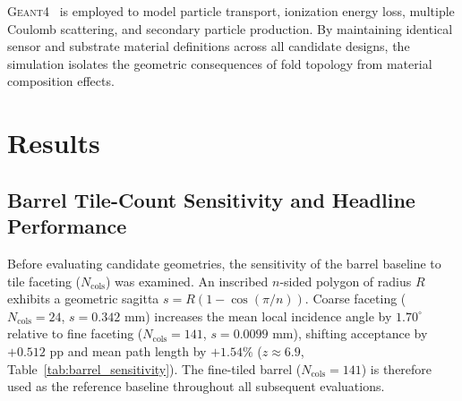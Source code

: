 \documentclass[a4paper,11pt]{article}
\begin{document}
\textsc{Geant4}~\cite{Agostinelli2003} is employed to model particle transport, ionization energy loss, multiple Coulomb scattering, and secondary particle production. By maintaining identical sensor and substrate material definitions across all candidate designs, the simulation isolates the geometric consequences of fold topology from material composition effects.

\FloatBarrier
\section{Results}
\label{sec:results}

\subsection{Barrel Tile-Count Sensitivity and Headline Performance}
\label{sec:headline_results}

Before evaluating candidate geometries, the sensitivity of the barrel baseline to tile faceting ($N_{\text{cols}}$) was examined. An inscribed $n$-sided polygon of radius $R$ exhibits a geometric sagitta $s = R(1 - \cos(\pi/n))$. Coarse faceting ($N_{\text{cols}} = 24$, $s = 0.342\text{ mm}$) increases the mean local incidence angle by $1.70^\circ$ relative to fine faceting ($N_{\text{cols}} = 141$, $s = 0.0099\text{ mm}$), shifting acceptance by $+0.512$ pp and mean path length by $+1.54\%$ ($z \approx 6.9$, Table~\ref{tab:barrel_sensitivity}). The fine-tiled barrel ($N_{\text{cols}} = 141$) is therefore used as the reference baseline throughout all subsequent evaluations.

\begin{table}[!htbp]
\centering
\caption{Barrel baseline sensitivity to tile faceting ($500{,}000$ primary pions, $R = 40\text{ mm}$, scored under material-differentiated radiation lengths).}
\label{tab:barrel_sensitivity}
\smallskip
{}
\end{table}
\end{document}
